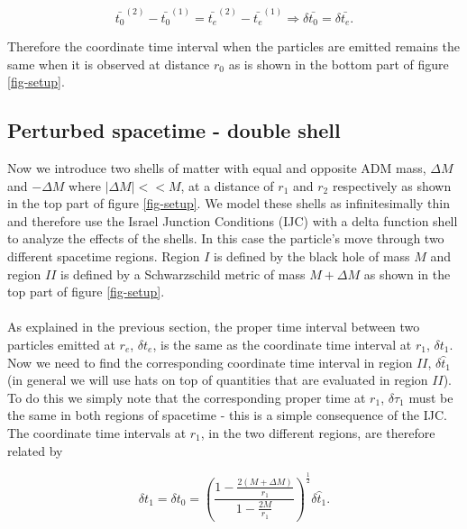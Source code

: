 \documentclass[aps,showpacs,onecolumn,floats,prd,superscriptaddress,nofootinbib]{revtex4-1}
\begin{document}
\begin{equation}
	\bar{t_0}^{(2)} - \bar{t_0}^{(1)} = \bar{t_e}^{(2)} - \bar{t_e}^{(1)} \Rightarrow \delta \bar{t_0} = \delta \bar{t_e}.
\end{equation}

Therefore the coordinate time interval when the particles are emitted remains the same when it is observed at distance $r_0$ as is shown in the bottom part of figure \ref{fig-setup}.

%
%

\subsection{Perturbed spacetime - double shell}

Now we introduce two shells of matter with equal and opposite ADM mass, $\Delta M$ and $-\Delta M$ where $|\Delta M|<<M$, at a distance of $r_1$ and $r_2$ respectively as shown in the top part of figure \ref{fig-setup}. We model these shells as infinitesimally thin and therefore use the Israel Junction Conditions (IJC) \cite{Isr66} with a delta function shell to analyze the effects of the shells. In this case the particle's move through two different spacetime regions. Region $I$ is defined by the black hole of mass $M$ and region $II$ is defined by a Schwarzschild metric of mass $M+\Delta M$ as shown in the top part of figure \ref{fig-setup}.
\\
\\
As explained in the previous section, the proper time interval between two particles emitted at $r_e$, $\delta t_e$, is the same as the coordinate time interval at $r_1$, $\delta t_1$. Now we need to find the corresponding coordinate time interval in region $II$, $\delta \hat{t}_1$ (in general we will use hats on top of quantities that are evaluated in region $II$). To do this we simply note that the corresponding proper time at $r_1$, $\delta \tau_1$ must be the same in both regions of spacetime - this is a simple consequence of the IJC. The coordinate time intervals at $r_1$, in the two different regions, are therefore related by

\begin{equation}
	\delta t_1 = \delta t_0 = \left( \frac{1 - \frac{2(M + \Delta M)}{r_1}}{1 - \frac{2M}{r_1}} \right)^\frac{1}{2} \delta \hat{t}_1.
\end{equation}
\end{document}
